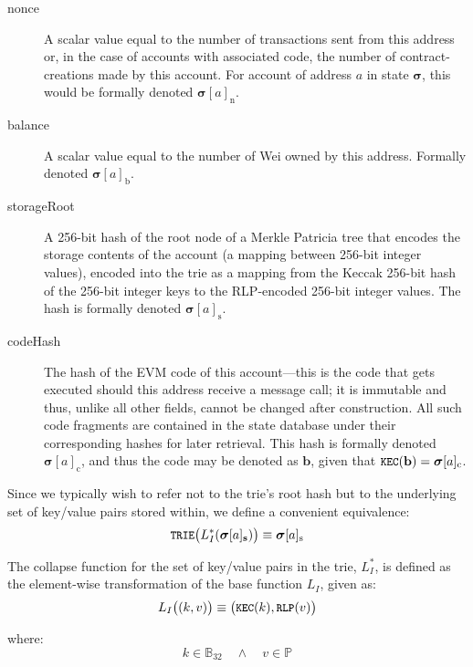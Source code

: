 \documentclass[9pt,oneside]{amsart}
\makeatletter
\newcommand{\linkdest}[1]{\Hy@raisedlink{\hypertarget{#1}{}}}
\makeatother
\begin{document}
\begin{multicols}{2}
\begin{description}
\item[nonce] \linkdest{account_nonce}A scalar value equal to the number of transactions sent from this address or, in the case of accounts with associated code, the number of contract-creations made by this account. For account of address $a$ in state $\boldsymbol{\sigma}$, this would be formally denoted $\boldsymbol{\sigma}[a]_{\mathrm{n}}$.
\item[balance] A scalar value equal to the number of Wei owned by this address. Formally denoted $\boldsymbol{\sigma}[a]_{\mathrm{b}}$.
\item[storageRoot] A 256-bit hash of the root node of a Merkle Patricia tree that encodes the storage contents of the account (a mapping between 256-bit integer values), encoded into the trie as a mapping from the Keccak 256-bit hash of the  256-bit integer keys to the RLP-encoded 256-bit integer values. The hash is formally denoted $\boldsymbol{\sigma}[a]_{\mathrm{s}}$.
\item[codeHash] The hash of the EVM code of this account---this is the code that gets executed should this address receive a message call; it is immutable and thus, unlike all other fields, cannot be changed after construction. All such code fragments are contained in the state database under their corresponding hashes for later retrieval. This hash is formally denoted $\boldsymbol{\sigma}[a]_{\mathrm{c}}$, and thus the code may be denoted as $\mathbf{b}$, given that $\texttt{\small KEC}(\mathbf{b}) = \boldsymbol{\sigma}[a]_{\mathrm{c}}$.
\end{description}

Since we typically wish to refer not to the trie's root hash but to the underlying set of key/value pairs stored within, we define a convenient equivalence:
\begin{equation}
\texttt{\small TRIE}\big(L_{I}^*(\boldsymbol{\sigma}[a]_{\mathbf{s}})\big) \equiv \boldsymbol{\sigma}[a]_{\mathrm{s}}
\end{equation}

The collapse function for the set of key/value pairs in the trie, $L_{I}^*$, is defined as the element-wise transformation of the base function $L_{I}$, given as:
\begin{equation}
L_{I}\big( (k, v) \big) \equiv \big(\texttt{\small KEC}(k), \texttt{\small RLP}(v)\big)
\end{equation}

where:
\begin{equation}
k \in \mathbb{B}_{32} \quad \wedge \quad v \in \mathbb{P}
\end{equation}


\end{multicols}
\end{document}
